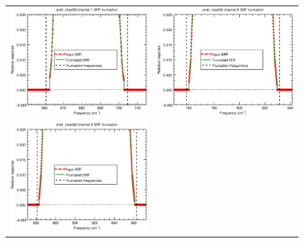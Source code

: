 \begin{figure}[H]
  \centering
  \begin{tabular}{c c}
    \includegraphics[scale=0.35]{graphics/sndr/trunc/sndr_insat3d-1.trunc.eps} &
    \includegraphics[scale=0.35]{graphics/sndr/trunc/sndr_insat3d-6.trunc.eps} \\
    \includegraphics[scale=0.35]{graphics/sndr/trunc/sndr_insat3d-8.trunc.eps} &

\end{tabular}
\end{figure}
